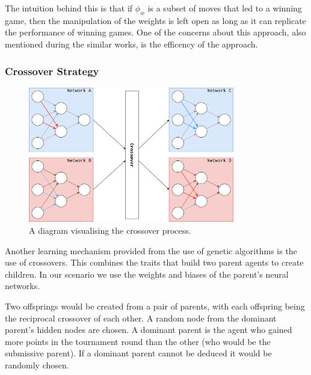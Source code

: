 \documentclass[12pt,a4paper]{article}
\begin{document}
            The intuition behind this is that if $\phi_{w}$ is a subset of moves that led to a winning game, then the manipulation of the weights is left open as long as it can replicate the performance of winning games. One of the concerns about this approach, also mentioned during the similar works, is the efficency of the approach. %
            
        \subsubsection{Crossover Strategy} \label{crossover_strategy}

                
           \begin{figure}
                \centering
                \includegraphics[width=90mm]{images/crossover.png}
                \caption{A diagram visualising the crossover process.\label{crossoverpic}}
            \end{figure}

            Another learning mechanism provided from the use of genetic algorithms is the use of crossovers. This combines the traits that build two parent agents to create children. In our scenario we use the weights and biases of the parent's neural networks.


            Two offsprings would be created from a pair of parents, with each offspring being the reciprocal crossover of each other. 
            A random node from the dominant parent's hidden nodes are chosen. A dominant parent is the agent who gained more points in the tournament round than the other (who would be the submissive parent). If a dominant parent cannot be deduced it would be randomly chosen. 
\end{document}
